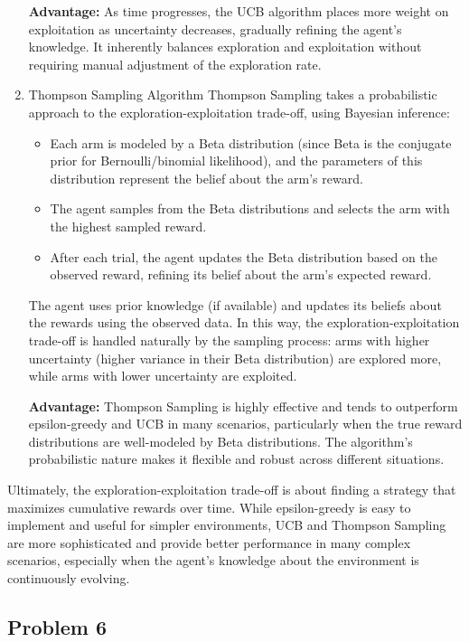 \documentclass[11pt]{article}
\begin{document}
\begin{enumerate}[1.]
  \textbf{Advantage:} As time progresses, the UCB algorithm places more weight on exploitation as uncertainty decreases, gradually refining the agent's knowledge. It inherently balances exploration and exploitation without requiring manual adjustment of the exploration rate.

  \item Thompson Sampling Algorithm
  Thompson Sampling takes a probabilistic approach to the exploration-exploitation trade-off, using Bayesian inference:
  \begin{itemize}
    \item Each arm is modeled by a Beta distribution (since Beta is the conjugate prior for Bernoulli/binomial likelihood), and the parameters of this distribution represent the belief about the arm's reward.
    \item The agent samples from the Beta distributions and selects the arm with the highest sampled reward.
    \item After each trial, the agent updates the Beta distribution based on the observed reward, refining its belief about the arm's expected reward.
  \end{itemize}
  The agent uses prior knowledge (if available) and updates its beliefs about the rewards using the observed data. In this way, the exploration-exploitation trade-off is handled naturally by the sampling process: arms with higher uncertainty (higher variance in their Beta distribution) are explored more, while arms with lower uncertainty are exploited.
  
  \textbf{Advantage:} Thompson Sampling is highly effective and tends to outperform epsilon-greedy and UCB in many scenarios, particularly when the true reward distributions are well-modeled by Beta distributions. The algorithm's probabilistic nature makes it flexible and robust across different situations.
\end{enumerate}
Ultimately, the exploration-exploitation trade-off is about finding a strategy that maximizes cumulative rewards over time. While epsilon-greedy is easy to implement and useful for simpler environments, UCB and Thompson Sampling are more sophisticated and provide better performance in many complex scenarios, especially when the agent's knowledge about the environment is continuously evolving.

\newpage
\subsection{Problem 6}
\end{document}

